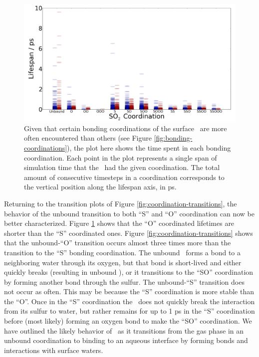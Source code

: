 \documentclass{article}
\begin{document}
\begin{figure}[h!]
	\begin{center}
		\includegraphics[scale=1.0]{coordination-lifespans.png}
		\caption{Given that certain bonding coordinations of the surface \suldiox~are more often encountered than others (see Figure \ref{fig:bonding-coordinations}), the plot here shows the time spent in each bonding coordination. Each point in the plot represents a single span of simulation time that the \suldiox~had the given coordination. The total amount of consecutive timesteps in a coordination corresponds to the vertical position along the lifespan axis, in ps.}
		\label{fig:coordination-lifespans}
	\end{center}
\end{figure}

Returning to the transition plots of Figure \ref{fig:coordination-transitions}, the behavior of the unbound transition to both ``S'' and ``O'' coordination can now be better characterized. Figure \ref{fig:coordination-lifespans} shows that the ``O'' coordinated lifetimes are shorter than the ``S'' coordinated ones. Figure \ref{fig:coordination-transitions} shows that the unbound-``O'' transition occurs almost three times more than the transition to the ``S'' bonding coordination. The unbound \suldiox~forms a bond to a neighboring water through its oxygen, but that bond is short-lived and either quickly breaks (resulting in unbound \suldiox), or it transitions to the ``SO'' coordination by forming another bond through the sulfur. The unbound-``S'' transition does not occur as often. This may be because the ``S'' coordination is more stable than the ``O''. Once in the ``S'' coordination the \suldiox~does not quickly break the interaction from its sulfur to water, but rather remains for up to 1 ps in the ``S'' coordination before (most likely) forming an oxygen bond to make the ``SO'' coordination. We have outlined the likely behavior of \suldiox~as it transitions from the gas phase in an unbound coordination to binding to an aqueous interface by forming bonds and interactions with surface waters.
\end{document}

